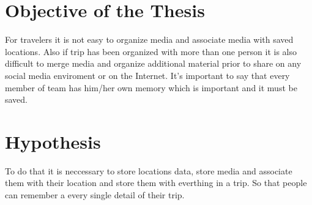 \section{Objective of the Thesis}
For travelers it is not easy to organize media and associate media with saved locations. Also if trip has been organized with more than one person it is also difficult to merge media and organize additional material prior to share on any social media enviroment or on the Internet. It's important to say that every member of team has him/her own memory which is important and it must be saved.

\section{Hypothesis}
To do that it is neccessary to store locations data, store media and associate them with their location and store them with everthing in a trip. So that people can remember a every single detail of their trip.